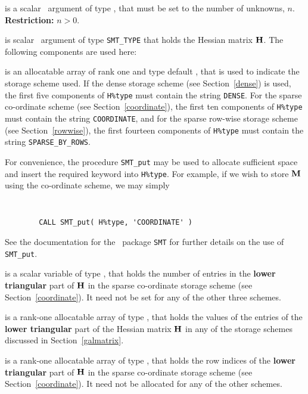 \documentclass{galahad}
\begin{document}
\begin{description}

 is a scalar \intentin\ argument of type \integer, that must be
set to the number of unknowns, $n$. {\bf Restriction: } $n  >  0$.

 is scalar \intentin\ argument of type {\tt SMT\_TYPE}
that holds the Hessian matrix ${\mathbf{H}}$. The following components
are used here:

\begin{description}

 is an allocatable array of rank one and type default
\character, that
is used to indicate the storage scheme used. If the dense storage scheme
(see Section~\ref{dense}) is used,
the first five components of {\tt H\%type} must contain the
string {\tt DENSE}.
For the sparse co-ordinate scheme (see Section~\ref{coordinate}),
the first ten components of {\tt H\%type} must contain the
string {\tt COORDINATE},
and for the sparse row-wise storage scheme (see Section~\ref{rowwise}),
the first fourteen components of {\tt H\%type} must contain the
string {\tt SPARSE\_BY\_ROWS}.

For convenience, the procedure {\tt SMT\_put}
may be used to allocate sufficient space and insert the required keyword
into {\tt H\%type}.
For example, if we wish to store ${\mathbf{M}}$ using the co-ordinate scheme,
we may simply
{\tt
\begin{verbatim}
        CALL SMT_put( H%type, 'COORDINATE' )
\end{verbatim}
}
\noindent
See the documentation for the \galahad\ package {\tt SMT}
for further details on the use of {\tt SMT\_put}.

 is a scalar variable of type \integer, that
holds the number of entries in the {\bf lower triangular} part of ${\mathbf{H}}$
in the sparse co-ordinate storage scheme (see Section~\ref{coordinate}).
It need not be set for any of the other three schemes.

 is a rank-one allocatable array of type \realdp, that holds
the values of the entries of the {\bf lower triangular} part
of the Hessian matrix ${\mathbf{H}}$ in any of the
storage schemes discussed in Section~\ref{galmatrix}.

 is a rank-one allocatable array of type \integer,
that holds the row indices of the {\bf lower triangular} part of ${\mathbf{H}}$
in the sparse co-ordinate storage
scheme (see Section~\ref{coordinate}).
It need not be allocated for any of the other schemes.


\end{description}
\end{description}
\end{document}
